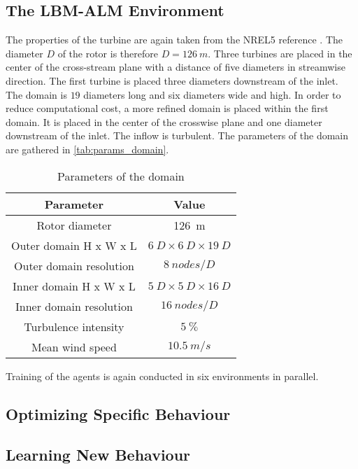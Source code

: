 \subsection{The LBM-ALM Environment}
\label{ssec:LBM_ALM_env}
The properties of the turbine are again taken from the NREL5 reference \cite{jonkman_definition_2009}. The diameter $D$ of the rotor is therefore $D=\SI{126}{m}$. Three turbines are placed in the center of the cross-stream plane with a distance of five diameters in streamwise direction. The first turbine is placed three diameters downstream of the inlet. The domain is $19$ diameters long and six diameters wide and high. In order to reduce computational cost, a more refined domain is placed within the first domain. It is placed in the center of the crosswise plane and one diameter downstream of the inlet. The inflow is turbulent. The parameters of the domain are gathered in \autoref{tab:params_domain}. \\
\begin{table}[h]
	\centering
	\caption{Parameters of the domain}
	\begin{tabular}{|c|c|}
	\hline
	Parameter & Value \\ \hline \hline
	Rotor diameter & \SI{126}{m} \\ \hline
	Outer domain H x W x L & $\SI{6}{D} \times \SI{6}{D} \times \SI{19}{D}$ \\ \hline
	Outer domain resolution & $\SI{8}{nodes/D}$ \\ \hline
	Inner domain H x W x L & $\SI{5}{D} \times \SI{5}{D} \times \SI{16}{D}$ \\ \hline
	Inner domain resolution & $\SI{16}{nodes/D}$ \\ \hline
	Turbulence intensity & $\SI{5}{\percent} $ \\ \hline
	Mean wind speed & $\SI{10.5}{m/s} $ \\ \hline
	\end{tabular}
	\label{tab:params_domain}
\end{table}
Training of the agents is again conducted in six environments in parallel.
\subsection{Optimizing Specific Behaviour}

\subsection{Learning New Behaviour}
